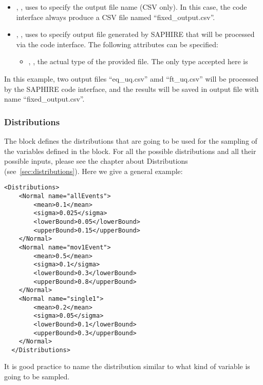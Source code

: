 \begin{itemize}
  \item {}, , uses to specify the output file name (CSV only). In this case, the code
    interface always produce a CSV file named ``fixed\_output.csv''.
  \item {}, , uses to specify output file generated by SAPHIRE that will be processed
    via the code interface. The following attributes can be specified:
    \begin{itemize}
      \item {}, , the actual type of the provided file. The
        only type accepted here is 
    \end{itemize}
\end{itemize}

In this example, two output files ``eq\_uq.csv'' amd ``ft\_uq.csv'' will be processed by the SAPHIRE code
interface, and the results will be saved in output file with name ``fixed\_output.csv''.

\subsubsection{Distributions}
The  block defines the distributions that are going to be used for the sampling
of the variables defined in the  block. For all the possible distributions and all
their possible inputs, please see the chapter about Distributions (see~\ref{sec:distributions}).
%
Here we give a general example:
\begin{lstlisting}[style=XML]
  <Distributions>
    <Normal name="allEvents">
        <mean>0.1</mean>
        <sigma>0.025</sigma>
        <lowerBound>0.05</lowerBound>
        <upperBound>0.15</upperBound>
    </Normal>
    <Normal name="mov1Event">
        <mean>0.5</mean>
        <sigma>0.1</sigma>
        <lowerBound>0.3</lowerBound>
        <upperBound>0.8</upperBound>
    </Normal>
    <Normal name="single1">
        <mean>0.2</mean>
        <sigma>0.05</sigma>
        <lowerBound>0.1</lowerBound>
        <upperBound>0.3</upperBound>
    </Normal>
  </Distributions>
\end{lstlisting}

It is good practice to name the distribution similar to what kind of variable is going to be sampled.
%

